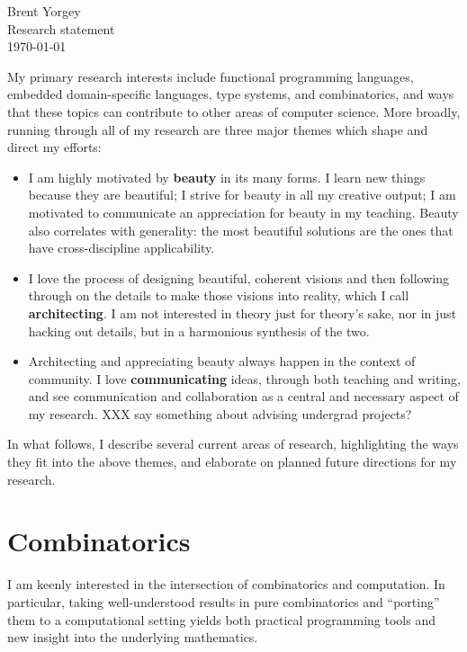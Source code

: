 \documentclass[12pt]{article}
\begin{document}
\noindent Brent Yorgey \\
Research statement \\
\today
\bigskip

My primary research interests include functional programming
languages, embedded domain-specific languages, type systems, and
combinatorics, and ways that these topics can contribute to other
areas of computer science.  More broadly, running through all of my
research are three major themes which shape and direct my efforts:

\begin{itemize}
\item I am highly motivated by \textbf{beauty} in its many forms.  I
  learn new things because they are beautiful; I strive for beauty in
  all my creative output; I am motivated to communicate an
  appreciation for beauty in my teaching.  Beauty also correlates
  with generality: the most beautiful solutions are the ones that have
  cross-discipline applicability.
\item I love the process of designing beautiful, coherent visions and
  then following through on the details to make those visions into
  reality, which I call \textbf{architecting}.  I am not interested in
  theory just for theory's sake, nor in just hacking out details, but
  in a harmonious synthesis of the two.
\item Architecting and appreciating beauty always happen in the
  context of community.  I love \textbf{communicating} ideas, through
  both teaching and writing, and see communication and collaboration
  as a central and necessary aspect of my research. XXX say something
  about advising undergrad projects?
\end{itemize}

In what follows, I describe several current areas of research,
highlighting the ways they fit into the above themes, and elaborate on
planned future directions for my research.

\section*{Combinatorics}
\label{sec:combinatorics}

I am keenly interested in the intersection of combinatorics and
computation.  In particular, taking well-understood results in pure
combinatorics and ``porting'' them to a computational setting yields
both practical programming tools and new insight into the underlying
mathematics.
\end{document}
